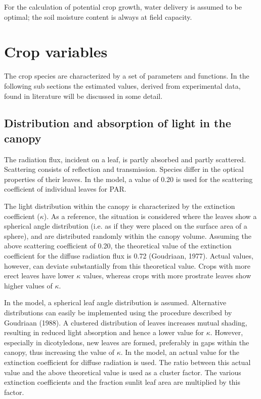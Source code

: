 For the calculation of potential crop growth, water delivery is assumed to be optimal; the
soil moisture content is always at field capacity.

\section{Crop variables}

The crop species are characterized by a set of parameters and functions. In the following
sub sections the estimated values, derived from experimental data, found in litera\-ture will
be discussed in some detail.

\subsection{Distribution and absorption of light in the canopy} 

The radiation flux, incident on a leaf, is partly absorbed and partly scattered. Scattering
consists of reflection and transmission. Species differ in the optical properties of their
leaves. In the model, a value of 0.20 is used for the scattering coefficient of individual 
leaves for PAR.

The light distribution within the canopy is characterized by the extinction coefficient ($\kappa$).
As a reference, the situation is considered where the leaves show a spherical angle
distribution (i.e. as if they were placed on the surface area of a sphere), and are 
distrib\-uted randomly within the canopy volume. Assuming the above scattering coefficient of
0.20, the theoretical value of the extinction coefficient for the diffuse radiation flux is
0.72 (Goudriaan, 1977). Actual values, however, can deviate substan\-tially from this
theoretical value. Crops with more erect leaves have lower $\kappa$ values, whereas crops with
more prostrate leaves show higher values of $\kappa$. 

In the model, a spherical leaf angle
distribution is assumed. Alternative distributions can easily be implemented using the
procedure described by Goudriaan (1988). A clustered distribution of leaves increases
mutual shading, resulting in reduced light absorption and hence a lower value for $\kappa$.
However, especially in dicotyledons, new leaves are formed, preferably in gaps within the
canopy, thus increasing the value of $\kappa$. In the model, an actual value for the extinction
coefficient for diffuse radiation is used. The ratio between this actual value and the above
theoretical value is used as a cluster factor. The various extinction coefficients and the
fraction sunlit leaf area are multiplied by this factor.

